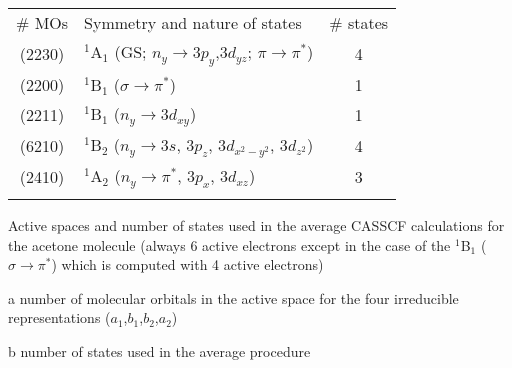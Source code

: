 \begin{center}
\begin{threeparttable}
\begin{tabular*}{0.80\textwidth}{clc}
\hline\noalign{\smallskip}
\# MOs \tnote{a} & Symmetry and nature of states    & \# states\tnote{b} \\
\noalign{\smallskip}\hline\noalign{\smallskip}
    (2230)   & $^1$A$_1$ (GS; $n_y\!\rightarrow\! 3p_y$,$3d_{yz}$; $\pi\!\rightarrow\!\pi^*$) & 4 \\
    (2200)   & $^1$B$_1$ ($\sigma\!\rightarrow\!\pi^*$) & 1\\
    (2211)   & $^1$B$_1$ ($n_y\!\rightarrow\! 3d_{xy}$) & 1 \\
    (6210)   & $^1$B$_2$ ($n_y\!\rightarrow\! 3s$, $3p_z$, $3d_{x^2\!-\!y^2}$, $3d_{z^2}$) & 4 \\
    (2410)   & $^1$A$_2$ ($n_y\!\rightarrow\!\pi^*$, $3p_x$, $3d_{xz}$) & 3 \\
\noalign{\smallskip}\hline
\end{tabular*}
\caption{\footnotesize Active spaces and number of states used in the average CASSCF
calculations for the acetone molecule (always 6 active electrons except in
the case of the $^1$B$_1$ ($\sigma\rightarrow\pi^*$) which is computed with
4 active electrons)}
\label{tbl:aceto_act}
\begin{tablenotes}
\footnotesize
\item[a] number of molecular orbitals in the active space for the four
irreducible representations ($a_1$,$b_1$,$b_2$,$a_2$)
\item[b] number of states used in the average procedure
\end{tablenotes}
\end{threeparttable}
\end{center}
